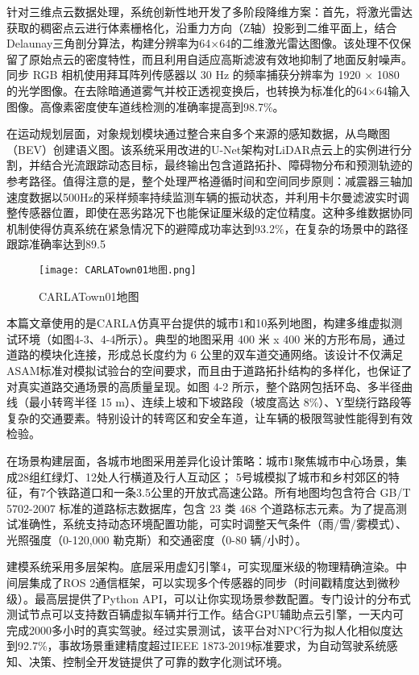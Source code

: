 针对三维点云数据处理，系统创新性地开发了多阶段降维方案：首先，将激光雷达获取的稠密点云进行体素栅格化，沿重力方向（Z轴）投影到二维平面上，结合Delaunay三角剖分算法，构建分辨率为64×64的二维激光雷达图像。该处理不仅保留了原始点云的密度特性，而且利用自适应高斯滤波有效地抑制了地面反射噪声。同步 RGB 相机使用拜耳阵列传感器以 30 Hz 的频率捕获分辨率为 1920 × 1080 的光学图像。在去除暗通道雾气并校正透视变换后，也转换为标准化的64×64输入图像。高像素密度使车道线检测的准确率提高到98.7\%。

在运动规划层面，对象规划模块通过整合来自多个来源的感知数据，从鸟瞰图（BEV）创建语义图。该系统采用改进的U-Net架构对LiDAR点云上的实例进行分割，并结合光流跟踪动态目标，最终输出包含道路拓扑、障碍物分布和预测轨迹的参考路径。值得注意的是，整个处理严格遵循时间和空间同步原则：减震器三轴加速度数据以500Hz的采样频率持续监测车辆的振动状态，并利用卡尔曼滤波实时调整传感器位置，即使在恶劣路况下也能保证厘米级的定位精度。这种多维数据协同机制使得仿真系统在紧急情况下的避障成功率达到93.2\%，在复杂的场景中的路径跟踪准确率达到89.5%

\begin{figure}[hbt]
	\centering
	\texttt{[image: CARLATown01地图.png]}
	\caption{CARLATown01地图}
	\label{f.example}
\end{figure}

本篇文章使用的是CARLA仿真平台提供的城市1和10系列地图，构建多维虚拟测试环境（如图4-3、4-4所示）。典型的地图采用 400 米 x 400 米的方形布局，通过道路的模块化连接，形成总长度约为 6 公里的双车道交通网络。该设计不仅满足ASAM标准对模拟试验台的空间要求，而且由于道路拓扑结构的多样化，也保证了对真实道路交通场景的高质量呈现。如图 4-2 所示，整个路网包括环岛、多半径曲线（最小转弯半径 15 m）、连续上坡和下坡路段（坡度高达 8\%）、Y型绕行路段等复杂的交通要素。特别设计的转弯区和安全车道，让车辆的极限驾驶性能得到有效检验。

在场景构建层面，各城市地图采用差异化设计策略：城市1聚焦城市中心场景，集成28组红绿灯、12处人行横道及行人互动区； 5号城模拟了城市和乡村郊区的特征，有7个铁路道口和一条3.5公里的开放式高速公路。所有地图均包含符合 GB/T 5702-2007 标准的道路标志数据库，包含 23 类 468 个道路标志元素。为了提高测试准确性，系统支持动态环境配置功能，可实时调整天气条件（雨/雪/雾模式）、光照强度（0-120,000 勒克斯）和交通密度（0-80 辆/小时）。

建模系统采用多层架构。底层采用虚幻引擎4，可实现厘米级的物理精确渲染。中间层集成了ROS 2通信框架，可以实现多个传感器的同步（时间戳精度达到微秒级）。最高层提供了Python API，可以让你实现场景参数配置。专门设计的分布式测试节点可以支持数百辆虚拟车辆并行工作。结合GPU辅助点云引擎，一天内可完成2000多小时的真实驾驶。经过实景测试，该平台对NPC行为拟人化相似度达到92.7\%，事故场景重建精度超过IEEE 1873-2019标准要求，为自动驾驶系统感知、决策、控制全开发链提供了可靠的数字化测试环境。

